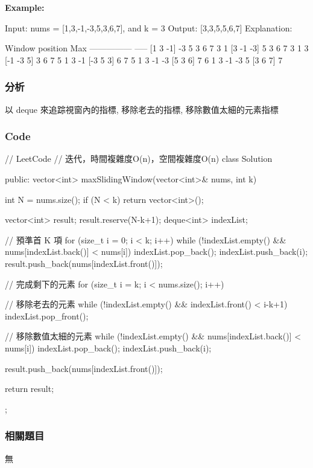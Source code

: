 \textbf{Example:}
\begin{Code}
Input: nums = [1,3,-1,-3,5,3,6,7], and k = 3
Output: [3,3,5,5,6,7]
Explanation:

Window position                Max
---------------               -----
[1  3  -1] -3  5  3  6  7       3
 1 [3  -1  -3] 5  3  6  7       3
 1  3 [-1  -3  5] 3  6  7       5
 1  3  -1 [-3  5  3] 6  7       5
 1  3  -1  -3 [5  3  6] 7       6
 1  3  -1  -3  5 [3  6  7]      7
\end{Code}


\subsubsection{分析}
以 deque 來追踪視窗內的指標, 移除老去的指標, 移除數值太細的元素指標


\subsubsection{Code}
\begin{Code}
// LeetCode
// 迭代，時間複雜度O(n)，空間複雜度O(n)
class Solution {
public:
    vector<int> maxSlidingWindow(vector<int>& nums, int k) {
        int N = nums.size();
        if (N < k) return vector<int>();

        vector<int> result; result.reserve(N-k+1);
        deque<int> indexList;

        // 預準首 K 項
        for (size_t i = 0; i < k; i++)
        {
            while (!indexList.empty() && nums[indexList.back()] < nums[i])
                indexList.pop_back();
            indexList.push_back(i);
        }
        result.push_back(nums[indexList.front()]);

        // 完成剩下的元素
        for (size_t i = k; i < nums.size(); i++)
        {
            // 移除老去的元素
            while (!indexList.empty() && indexList.front() < i-k+1)
                indexList.pop_front();

            // 移除數值太細的元素
            while (!indexList.empty() && nums[indexList.back()] < nums[i])
                indexList.pop_back();
            indexList.push_back(i);

            result.push_back(nums[indexList.front()]);
        }

        return result;
    }
};
\end{Code}


\subsubsection{相關題目}
\begindot
\item 無
\myenddot

